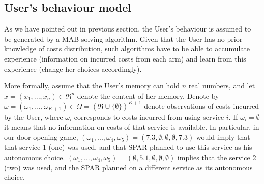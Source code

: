 \documentclass{msdm2012}
\begin{document}
\subsection{User's behaviour model}
As we have pointed out in previous section, the User's behaviour is
assumed to be generated by a MAB solving algorithm. Given that the
User has no prior knowledge of costs distribution, such algorithms
have to be able to accumulate experience (information on incurred
costs from each arm) and learn from this experience (change her
choices accordingly).





More formally, assume that the User's memory can hold $n$ real
numbers, and let $x=(x_1,...,x_n)\in\Re^n$ denote the content of her
memory. Denote by $\omega=(\omega_1,...,\omega_{K+1})\in
\Omega=(\Re\cup\{\emptyset\})^{K+1}$ denote observations of costs
incurred by the User, where $\omega_i$ corresponds to costs incurred
from using service $i$. If $\omega_i=\emptyset$ it means that no
information on costs of that service is available. In particular, in
our door opening game,
$(\omega_1,...,\omega_4,\omega_5)=(7.3,\emptyset,\emptyset,\emptyset,7.3)$
would imply that that service 1 (one) was used, and that SPAR planned
to use this service as his autonomous
choice. $(\omega_1,...,\omega_4,\omega_5)=(\emptyset,5.1,\emptyset,\emptyset,\emptyset)$
implies that the service 2 (two) was used, and the SPAR planned on a
different service as its autonomous choice.
\end{document}
